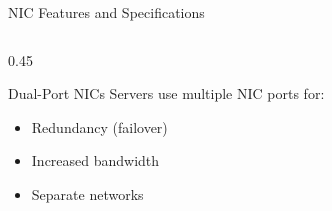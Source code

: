 \documentclass[aspectratio=169]{beamer}  %
\begin{document}
\begin{frame}{NIC Features and Specifications}
\begin{columns}[T]
\begin{column}{0.45\textwidth}
            \vspace{0.5em}
            \begin{block}{Dual-Port NICs}
                Servers use multiple NIC ports for:
                \begin{itemize}
                    \item Redundancy (failover)
                    \item Increased bandwidth
                    \item Separate networks
                \end{itemize}
            \end{block}
        \end{column}
    \end{columns}
\end{frame}
\end{document}
